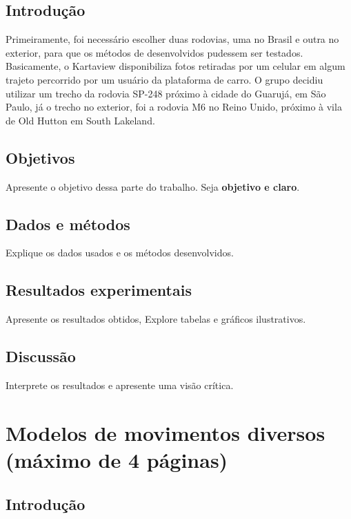 \documentclass{article}
\begin{document}
\subsection{Introdução}

Primeiramente, foi necessário escolher duas rodovias, uma no Brasil e outra no exterior, para que os métodos de desenvolvidos pudessem ser testados. Basicamente, o Kartaview disponibiliza fotos retiradas por um celular em algum trajeto percorrido por um usuário da plataforma de carro. O grupo decidiu utilizar um trecho da rodovia SP-248 próximo à cidade do Guarujá, em São Paulo, já o trecho no exterior, foi a rodovia M6 no Reino Unido, próximo à vila de Old Hutton em South Lakeland.

\subsection{Objetivos}

Apresente o objetivo dessa parte do trabalho. Seja {\bf objetivo e claro}.

\subsection{Dados e métodos}

Explique os dados usados e os métodos desenvolvidos.

\subsection{Resultados experimentais}

Apresente os resultados obtidos, Explore tabelas e gráficos ilustrativos.

\subsection{Discussão}

Interprete os resultados e apresente uma visão crítica.

\newpage

\section{Modelos de movimentos diversos (máximo de 4 páginas)}

\subsection{Introdução}
\end{document}
